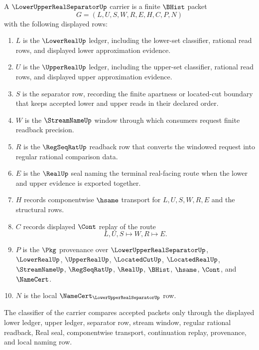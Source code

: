 \begin{definition}
\label{def:lower-upper-real-separator-carrier}
A $\LowerUpperRealSeparatorUp$ carrier is a finite $\BHist$ packet
$$
G=(L,U,S,W,R,E,H,C,P,N)
$$
with the following displayed rows:
\begin{enumerate}
\item $L$ is the $\LowerRealUp$ ledger, including the lower-set classifier, rational read rows, and displayed lower approximation evidence.
\item $U$ is the $\UpperRealUp$ ledger, including the upper-set classifier, rational read rows, and displayed upper approximation evidence.
\item $S$ is the separator row, recording the finite apartness or located-cut boundary that keeps accepted lower and upper reads in their declared order.
\item $W$ is the $\StreamNameUp$ window through which consumers request finite readback precision.
\item $R$ is the $\RegSeqRatUp$ readback row that converts the windowed request into regular rational comparison data.
\item $E$ is the $\RealUp$ seal naming the terminal real-facing route when the lower and upper evidence is exported together.
\item $H$ records componentwise $\hsame$ transport for $L,U,S,W,R,E$ and the structural rows.
\item $C$ records displayed $\Cont$ replay of the route
$$
L,U,S \longmapsto W,R \longmapsto E .
$$
\item $P$ is the $\Pkg$ provenance over $\LowerUpperRealSeparatorUp$, $\LowerRealUp$, $\UpperRealUp$, $\LocatedCutUp$, $\LocatedRealUp$, $\StreamNameUp$, $\RegSeqRatUp$, $\RealUp$, $\BHist$, $\hsame$, $\Cont$, and $\NameCert$.
\item $N$ is the local $\NameCert_{\LowerUpperRealSeparatorUp}$ row.
\end{enumerate}
The classifier of the carrier compares accepted packets only through the displayed lower ledger, upper ledger, separator row, stream window, regular rational readback, Real seal, componentwise transport, continuation replay, provenance, and local naming row.
\end{definition}


